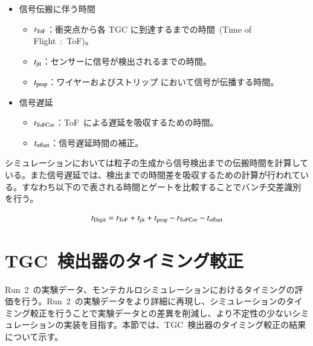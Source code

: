 \begin{itemize}
\item 信号伝搬に伴う時間
\begin{itemize}
\item $t_{\rm{ToF}}$：衝突点から各 TGC に到達するまでの時間~(Time of Flight~:~ToF)。
\item $t_{\rm{jit}}$：センサーに信号が検出されるまでの時間。
\item $t_{\rm{prop}}$：ワイヤーおよびストリップ において信号が伝播する時間。
\end{itemize}
\end{itemize}
\begin{itemize}
\item 信号遅延
\begin{itemize}
\item $t_{\rm{ToFCor}}$：ToF~による遅延を吸収するための時間。
\item $t_{\rm{offset}}$：信号遅延時間の補正。
\end{itemize}
\end{itemize}

シミュレーションにおいては粒子の生成から信号検出までの伝搬時間を計算している。また信号遅延では、検出までの時間差を吸収するための計算が行われている。すなわち以下ので表される時間とゲートを比較することでバンチ交差識別を行う。

\begin{align}
    \it{t_{\rm{Digit}}=t_{\rm{ToF}}+t_{\rm{jit}}+t_{\rm{prop}}-t_{\rm{ToFCor}}-t_{\rm{offset}}}\label{eq:tdigit}
\end{align}

\section{TGC~検出器のタイミング較正}
Run~2~の実験データ、モンテカルロシミュレーションにおけるタイミングの評価を行う。Run~2~の実験データをより詳細に再現し、シミュレーションのタイミング較正を行うことで実験データとの差異を削減し、より不定性の少ないシミュレーションの実装を目指す。本節では、TGC~検出器のタイミング較正の結果について示す。

